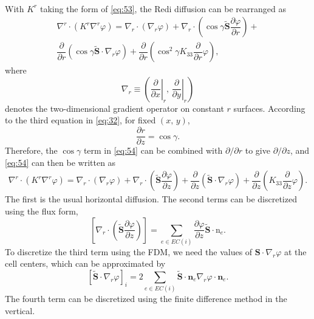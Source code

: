 \documentclass[12pt]{report}
\def\p{\partial}
\def\tilde{\widetilde}
\def\bs{\boldsymbol}
\def\nb{\bs{\mathrm{n}}}
\begin{document}
\\
With $K^r$ taking the form of \eqref{eq:53}, the Redi
diffusion can be rearranged as
\begin{multline}
\label{eq:54}
  \nabla^r\cdot(K^r\nabla^r\varphi) = \nabla_r\cdot(\nabla_r\varphi)
  + \nabla_r\cdot\left(\cos\gamma\tilde{\mathbf{S}}\dfrac{\p\varphi}{\p
      r}\right) +\\ \dfrac{\p}{\p
    r}\left(\cos\gamma\tilde{\mathbf{S}}\cdot\nabla_r\varphi\right) +
  \dfrac{\p}{\p r}\left(\cos^2\gamma K_{33}\dfrac{\p}{\p
      r}\varphi\right), 
\end{multline}
where 
$$\nabla_r \equiv \left(\left.\frac{\p}{\p x}\right|_r,\, \left.\frac{\p}{\p
    y}\right|_r\right)$$
denotes the two-dimensional gradient operator on
constant $r$ surfaces. According to the third equation in
\eqref{eq:32}, for fixed $(x,\,y)$, 
\begin{displaymath}
  \dfrac{\p r}{\p z} = \cos\gamma.
\end{displaymath}
Therefore, the $\cos\gamma$ term in \eqref{eq:54} can be combined with
$\p/\p r$ to give $\p/\p z$, and \eqref{eq:54} can then be written as
\begin{multline}
\label{eq:55}
  \nabla^r\cdot(K^r\nabla^r\varphi) = \nabla_r\cdot(\nabla_r\varphi)
  + \nabla_r\cdot\left(\tilde{\mathbf{S}}\dfrac{\p\varphi}{\p
      z}\right) + \dfrac{\p}{\p
    z}\left(\tilde{\mathbf{S}}\cdot\nabla_r\varphi\right) +
  \dfrac{\p}{\p z}\left( K_{33}\dfrac{\p}{\p
      z}\varphi\right).
\end{multline}
The first is the usual horizontal diffusion. The second terms can be
discretized using the flux form,
\begin{equation}
  \label{eq:58}
  \left[ \nabla_r\cdot\left(\tilde{\mathbf{S}}\dfrac{\p\varphi}{\p
      z}\right)\right] = 
\sum_{e\in EC(i)} \dfrac{\p\varphi}{\p z}\tilde{\mathbf{S}}\cdot\nb_e.
\end{equation}
 To discretize the
third term using the FDM, we need the values of
$\mathbf{S}\cdot\nabla_r\varphi$ at the cell centers, which can be
approximated by
\begin{equation}
\label{eq:59}
  \left[\tilde{\mathbf{S}}\cdot\nabla_r\varphi\right]_i = 2\sum_{e\in
    EC(i)}\tilde{\mathbf{S}}\cdot\mathbf{n}_e {\nabla_r\varphi}\cdot\mathbf{n}_e.
\end{equation}
The fourth term can be discretized
using the finite difference method in the vertical.
\end{document}
